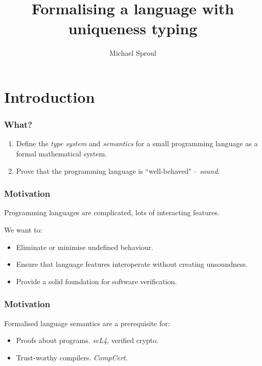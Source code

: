 \documentclass[10pt]{beamer}
\title{Formalising a language with uniqueness typing}
\author{Michael Sproul}
\date{}
\institute{
    Supervisor: Ben Lippmeier\\
    University of New South Wales
}
\begin{document}
\maketitle

\section{Introduction}

\begin{frame}
\frametitle{What?}

\begin{enumerate}
\item Define the \textit{type system} and \textit{semantics} for a small programming language as a formal mathematical system.
\item Prove that the programming language is ``well-behaved" -- \textit{sound}.
\end{enumerate}
\end{frame}

\begin{frame}
\frametitle{Motivation}

Programming languages are complicated, lots of interacting features.

We want to:

\begin{itemize}
\item Eliminate or minimise undefined behaviour.

\item Ensure that language features interoperate without creating unsoundness.

\item Provide a solid foundation for software verification.

\end{itemize}
\end{frame}

\begin{frame}
\frametitle{Motivation}

Formalised language semantics are a prerequisite for:

\begin{itemize}
\item Proofs about programs. \textit{seL4}, verified crypto.
\item Trust-worthy compilers. \textit{CompCert}.
\end{itemize}

\end{frame}
\end{document}
